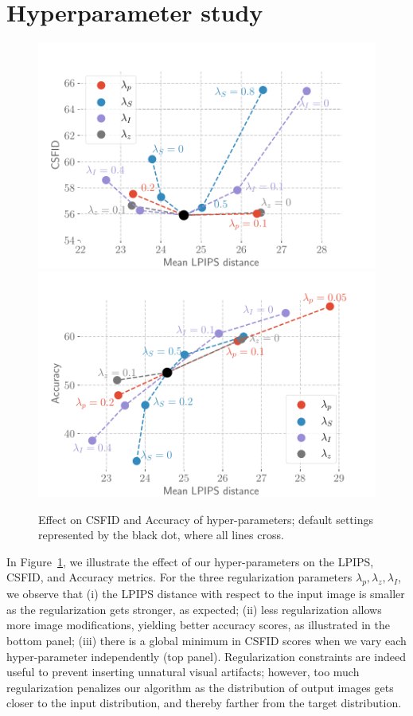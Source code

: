 \section{Hyperparameter study\label{hparam}}

\begin{figure}
    \centering
    \includegraphics[width=\linewidth]{images/flexit/assets/hparam_fig.pdf}
    \includegraphics[width=\linewidth]{images/flexit/assets/hparam_acc.pdf}
    \caption{
    Effect  on \ac{CSFID} and Accuracy of hyper-parameters;  default settings  represented by 
    the black dot, where all lines cross.
    }
    
    \label{fig:hparam_csfid}
\end{figure}


In Figure~\ref{fig:hparam_csfid}, we illustrate the effect of our hyper-parameters on
 the \ac{LPIPS}, \ac{CSFID}, and Accuracy metrics. 
For the three regularization parameters $\lambda_p, \lambda_z, \lambda_I$, we observe
 that
(i) the \ac{LPIPS} distance with respect to the input image is smaller as the regularization 
gets stronger, as expected; 
(ii) less regularization allows more image modifications, yielding better accuracy
 scores, as illustrated in the bottom panel; 
(iii) there is a global minimum in \ac{CSFID} scores when we vary each hyper-parameter 
 independently (top panel). Regularization constraints are indeed useful to prevent
  inserting unnatural visual artifacts; however, too much regularization penalizes our 
  algorithm as the distribution of output images gets closer to the input distribution, 
  and thereby farther from the  target distribution.

